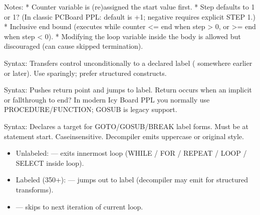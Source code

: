 \documentclass[letterpaper,10pt,english]{sphinxmanual}
\begin{document}
\begin{description}
\sphinxAtStartPar
Notes:
* Counter variable is (re)assigned the start value first.
* Step defaults to 1 or \sphinxhyphen{}1? (In classic PCBoard PPL: default is +1; negative requires explicit STEP \sphinxhyphen{}1.)
* Inclusive end bound (executes while counter \textless{}= end when step \textgreater{} 0, or \textgreater{}= end when step \textless{} 0).
* Modifying the loop variable inside the body is allowed but discouraged (can cause skipped termination).

\sphinxAtStartPar
Syntax: 
Transfers control unconditionally to a declared label ( somewhere earlier or later).
Use sparingly; prefer structured constructs.

\sphinxAtStartPar
Syntax: 
Pushes return point and jumps to label. Return occurs when an implicit  or fall\sphinxhyphen{}through to end?
In modern Icy Board PPL you normally use PROCEDURE/FUNCTION; GOSUB is legacy support.

\sphinxAtStartPar
Syntax: 
Declares a target for GOTO/GOSUB/BREAK label forms. Must be at statement start.
Case\sphinxhyphen{}insensitive. Decompiler emits uppercase or original style.

\begin{description}
\begin{itemize}
\item {} 
\sphinxAtStartPar
Unlabeled:  — exits innermost loop (WHILE / FOR / REPEAT / LOOP / SELECT inside loop).

\item {} 
\sphinxAtStartPar
Labeled (350+):  — jumps out to label (decompiler may emit for structured transforms).

\end{itemize}

\end{description}

\begin{description}
\begin{itemize}
\item {} 
\sphinxAtStartPar
{} — skips to next iteration of current loop.


\end{itemize}
\end{description}
\end{description}
\end{document}
